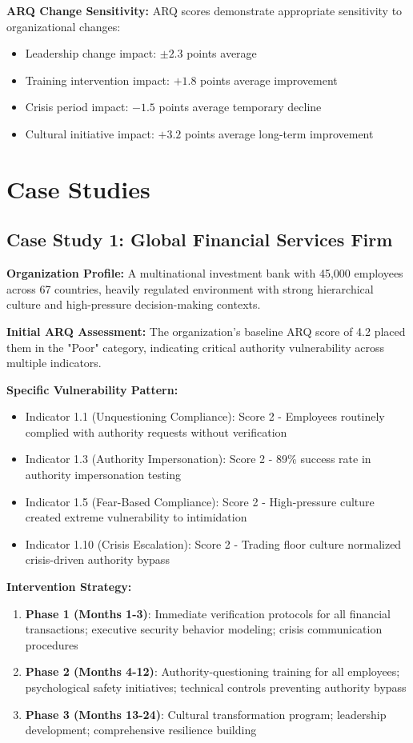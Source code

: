 \documentclass[11pt,a4paper]{article}
\begin{document}
\textbf{ARQ Change Sensitivity:}
ARQ scores demonstrate appropriate sensitivity to organizational changes:
\begin{itemize}
\item Leadership change impact: $\pm 2.3$ points average
\item Training intervention impact: $+1.8$ points average improvement
\item Crisis period impact: $-1.5$ points average temporary decline
\item Cultural initiative impact: $+3.2$ points average long-term improvement
\end{itemize}

\section{Case Studies}

\subsection{Case Study 1: Global Financial Services Firm}

\textbf{Organization Profile:}
A multinational investment bank with 45,000 employees across 67 countries, heavily regulated environment with strong hierarchical culture and high-pressure decision-making contexts.

\textbf{Initial ARQ Assessment:}
The organization's baseline ARQ score of 4.2 placed them in the "Poor" category, indicating critical authority vulnerability across multiple indicators.

\textbf{Specific Vulnerability Pattern:}
\begin{itemize}
\item Indicator 1.1 (Unquestioning Compliance): Score 2 - Employees routinely complied with authority requests without verification
\item Indicator 1.3 (Authority Impersonation): Score 2 - 89\% success rate in authority impersonation testing
\item Indicator 1.5 (Fear-Based Compliance): Score 2 - High-pressure culture created extreme vulnerability to intimidation
\item Indicator 1.10 (Crisis Escalation): Score 2 - Trading floor culture normalized crisis-driven authority bypass
\end{itemize}

\textbf{Intervention Strategy:}
\begin{enumerate}
\item \textbf{Phase 1 (Months 1-3)}: Immediate verification protocols for all financial transactions; executive security behavior modeling; crisis communication procedures
\item \textbf{Phase 2 (Months 4-12)}: Authority-questioning training for all employees; psychological safety initiatives; technical controls preventing authority bypass
\item \textbf{Phase 3 (Months 13-24)}: Cultural transformation program; leadership development; comprehensive resilience building
\end{enumerate}
\end{document}
